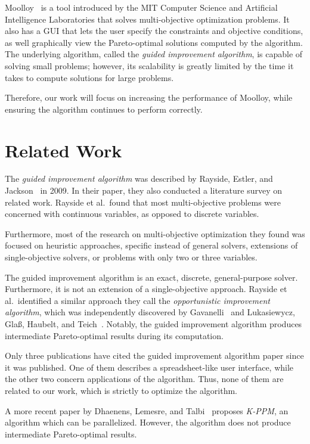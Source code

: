 \documentclass[11pt]{article}
\begin{document}
Moolloy~\cite{ref:Rayside09} is a tool introduced by the MIT Computer
Science and Artificial Intelligence Laboratories that solves
multi-objective optimization problems. It also has a GUI that lets the
user specify the constraints and objective conditions, as well
graphically view the Pareto-optimal solutions computed by the
algorithm. The underlying algorithm, called the \textit{guided
improvement algorithm}, is capable of solving small problems; however,
its scalability is greatly limited by the time it takes to compute
solutions for large problems.

Therefore, our work will focus on increasing the performance of
Moolloy, while ensuring the algorithm continues to perform correctly.

\section{Related Work}

The \textit{guided improvement algorithm} was described by Rayside,
Estler, and Jackson~\cite{ref:Rayside09} in 2009. In their paper, they
also conducted a literature survey on related work. Rayside et al.\
found that most multi-objective problems were concerned with continuous
variables, as opposed to discrete variables.

Furthermore, most of the research on multi-objective optimization they
found was focused on heuristic approaches, specific instead of general
solvers, extensions of single-objective solvers, or problems with only
two or three variables.

The guided improvement algorithm is an exact, discrete, general-purpose
solver. Furthermore, it is not an extension of a single-objective
approach. Rayside et al.\ identified a similar approach they call the
\textit{opportunistic improvement algorithm}, which was independently
discovered by Gavanelli~\cite{ref:Gavanelli02} and Lukasiewycz, Gla\ss,
Haubelt, and Teich~\cite{ref:Lukas07}. Notably, the guided improvement
algorithm produces intermediate Pareto-optimal results during its
computation.

Only three publications have cited the guided improvement algorithm
paper since it was published. One of them describes a spreadsheet-like
user interface, while the other two concern applications of the
algorithm. Thus, none of them are related to our work, which is
strictly to optimize the algorithm.

A more recent paper by Dhaenens, Lemesre, and Talbi~\cite{ref:kppm}
proposes \textit{\mbox{K-PPM}}, an algorithm which can be parallelized.
However, the algorithm does not produce intermediate Pareto-optimal
results.
\end{document}
